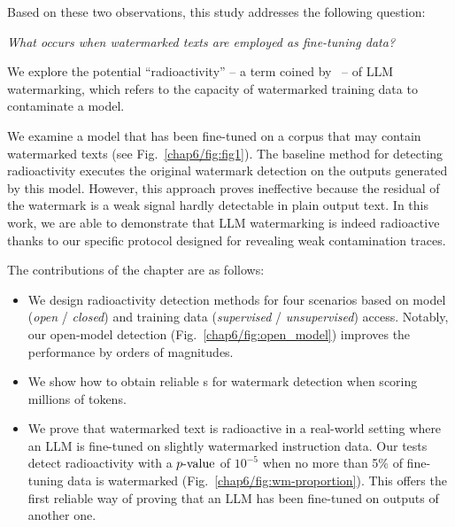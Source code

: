 \noindent
Based on these two observations, this study addresses the following question:
\begin{center}
\textit{What occurs when watermarked texts are employed as fine-tuning data?}
\end{center}
We explore the potential ``radioactivity'' -- a term coined by~\citet{sablayrolles2020radioactive} -- of LLM watermarking, which refers to the capacity of watermarked training data to contaminate a model.

We examine a model that has been fine-tuned on a corpus that may contain watermarked texts (see Fig.~\ref{chap6/fig:fig1}).
The baseline method for detecting radioactivity executes the original watermark detection on the outputs generated by this model. 
However, this approach proves ineffective because the residual of the watermark is a weak signal hardly detectable in plain output text.
In this work, we are able to demonstrate that LLM watermarking is indeed radioactive thanks to our specific protocol designed for revealing weak contamination traces.

The contributions of the chapter are as follows:
\begin{itemize}
    \item We design radioactivity detection methods for four scenarios based on model (\textit{open} / \textit{closed}) and training data (\textit{supervised} / \textit{unsupervised}) access. 
    Notably, our open-model detection (Fig.~\ref{chap6/fig:open_model}) improves the performance by orders of magnitudes.
\item 
    We show how to obtain reliable \pval s for watermark detection when scoring millions of tokens.
\item 
    We prove that watermarked text is radioactive in a real-world setting where an LLM is fine-tuned on slightly watermarked instruction data. 
    Our tests detect radioactivity with a $p\textrm{-value}$ of $10^{-5}$ when no more than 5\% of fine-tuning data is watermarked (Fig.~\ref{chap6/fig:wm-proportion}).
    This offers the first reliable way of proving that an LLM has been fine-tuned on outputs of another one.
\end{itemize}
